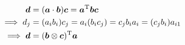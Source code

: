 \documentclass{article}
\begin{document}
\[
    \begin{aligned}
        {\bm d}          & = ({\bm a} \cdot {\bm b}) {\bm c} = {\bm a}^{\text T} {\bm b} {\bm c}              \\
        \implies d_j     & = (a_i b_i) c_j = a_i (b_i c_j) = c_j b_i a_i = (c_j b_i) a_{i1} \\
        \implies {\bm d} & = ({\bm b} \otimes {\bm c})^{\text T} {\bm a}
    \end{aligned}
\]





{}


\end{document}
